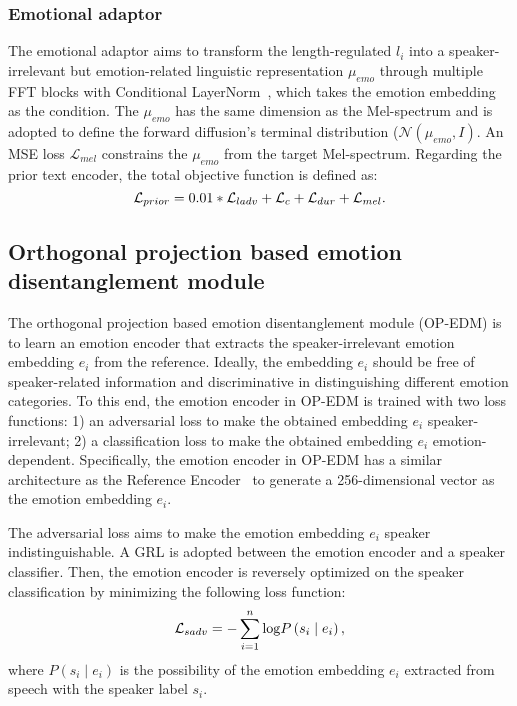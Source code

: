 \documentclass[journal,comsoc]{IEEEtran}
\begin{document}
\subsubsection{Emotional adaptor}
The emotional adaptor aims to transform the length-regulated ${l_i}$ into a speaker-irrelevant but emotion-related linguistic representation $\mu_{emo}$ through multiple FFT blocks with Conditional LayerNorm~\cite{chen2020adaspeech}, which takes the emotion embedding as the condition. The $\mu_{emo}$ has the same dimension as the Mel-spectrum and is adopted to define the forward diffusion's terminal distribution ($\mathcal{N}(\mu_{emo}, I)$.
An MSE loss $\mathcal{L}_{mel}$ constrains the $\mu_{emo}$ from the target Mel-spectrum.
Regarding the prior text encoder, the total objective function is defined as:
\begin{equation}
{{\cal L}_{prior}} = 0.01*{{\cal L}_{ladv}} + {{\cal L}_{c}} + {{\cal L}_{dur}} + {{\cal L}_{mel}}. 
\end{equation}

\vspace{-0.4cm}
\subsection{Orthogonal projection based emotion disentanglement module}
\label{sc:edm}

The orthogonal projection based emotion disentanglement module (OP-EDM) is to learn an emotion encoder that extracts the speaker-irrelevant emotion embedding $e_i$ from the reference. Ideally, the embedding $e_i$ should be free of speaker-related information and discriminative in distinguishing different emotion categories. 
To this end, the emotion encoder in OP-EDM is trained with two loss functions: 1) an adversarial loss to make the obtained embedding $e_i$ speaker-irrelevant; 2) a classification loss to make the obtained embedding $e_i$ emotion-dependent.
Specifically, the emotion encoder in OP-EDM has a similar architecture as the Reference Encoder~\cite{Skerry2018Towards} to generate a 256-dimensional vector as the emotion embedding $e_i$.

The adversarial loss aims to make the emotion embedding $e_i$ speaker indistinguishable. 
A GRL is adopted between the emotion encoder and a speaker classifier.
Then, the emotion encoder is reversely optimized on the speaker classification by minimizing the following loss function:
\begin{equation}
    {{\cal L}_{sadv}} =  - \sum\limits_{i = 1}^n {\log } P\left( {{s_i}\mid {e_i}} \right),
\end{equation}
where $P( {{s_i}\mid {e_i}})$ is the possibility of the emotion embedding $e_i$ extracted from speech with the speaker label $s_i$.
\end{document}

